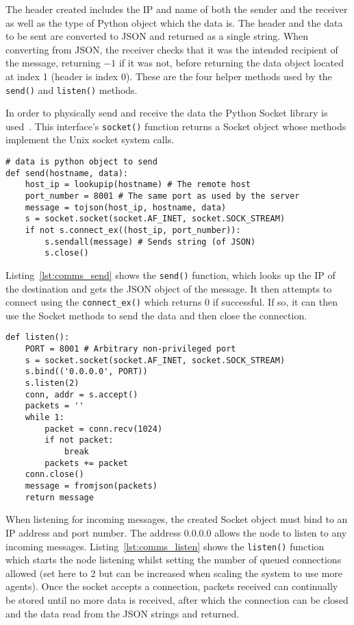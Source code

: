 The header created includes the IP and name of both the sender and the
receiver as well as the type of Python object which the data is. The header
and the data to be sent are converted to JSON and returned as a single
string. When  converting from JSON, the receiver checks that it was the
intended recipient of the message, returning $-1$ if it was not, before
returning the data object located at index 1 (header is index 0). These
are the four helper methods used by the \verb|send()| and \verb|listen()|
methods.

In order to physically send and receive the data the Python Socket library
is used~\cite{socketServerDocs}. This interface's \verb|socket()| function
returns a Socket object whose methods implement the Unix socket system calls.

\begin{lstlisting}[caption={send() Function}, label={lst:comms_send}]
# data is python object to send
def send(hostname, data):
    host_ip = lookupip(hostname) # The remote host
    port_number = 8001 # The same port as used by the server
    message = tojson(host_ip, hostname, data)
    s = socket.socket(socket.AF_INET, socket.SOCK_STREAM)
    if not s.connect_ex((host_ip, port_number)):
        s.sendall(message) # Sends string (of JSON)
        s.close()
\end{lstlisting}

Listing~\ref{lst:comms_send} shows the \verb|send()| function, which looks up the IP of the destination and gets the JSON
object of the message. It then attempts to connect using the \verb|connect_ex()|
which returns 0 if successful. If so, it can then use the Socket methods to send
the data and then close the connection.

\begin{lstlisting}[caption={listen() Function}, label={lst:comms_=listen}]
def listen():
    PORT = 8001 # Arbitrary non-privileged port
    s = socket.socket(socket.AF_INET, socket.SOCK_STREAM)
    s.bind(('0.0.0.0', PORT))
    s.listen(2)
    conn, addr = s.accept()
    packets = ''
    while 1:
        packet = conn.recv(1024)
        if not packet:
            break
        packets += packet
    conn.close()
    message = fromjson(packets)
    return message
\end{lstlisting}

When listening for incoming messages, the created Socket object must bind to
an IP address and port number. The address 0.0.0.0 allows the node to listen
to any incoming messages. Listing~\ref{lst:comms_listen} shows the \verb|listen()| function which starts the node listening
whilst setting the number of queued connections allowed (set here to 2 but can
be increased when scaling the system to use more agents). Once the socket
accepts a connection, packets received can continually be stored
until no more data is received, after which the connection can be closed and
the data read from the JSON strings and returned.



